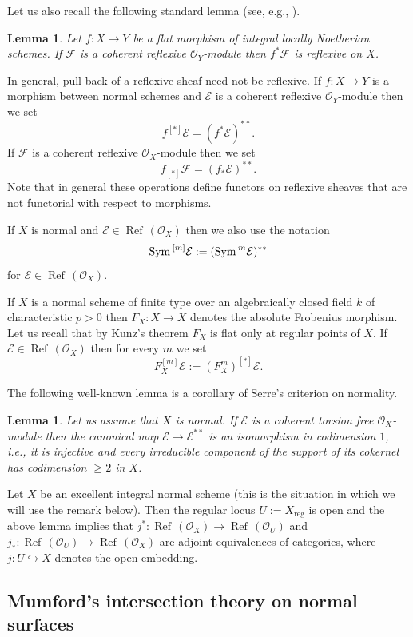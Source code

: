 \documentclass[twoside, 11pt]{article}
\theoremstyle{plain}
\newtheorem{Lemma}[Thm]{\sc Lemma}
\theoremstyle{definition}
\theoremstyle{remark}
\newcommand{\cE}{{\mathcal E}}
\newcommand{\cF}{{\mathcal F}}
\newcommand{\cO}{{\mathcal O}}
\newcommand{\Refl}{{\mathop{\operatorname{Ref}\, }}}
\newcommand{\Sym}{{\mathop{{\rm Sym \, }}}}
\begin{document}
Let us also recall the following standard lemma (see, e.g., \cite[Tag 0EBF]{SP}).

\begin{Lemma}
Let $f: X\to Y$ be a flat morphism of integral locally Noetherian schemes. If $\cF$ is a coherent reflexive $\cO_Y$-module then $f^*\cF$ is reflexive on $X$.
\end{Lemma}

In general, pull back of a reflexive sheaf need not be reflexive.
If $f: X\to Y$ is a morphism between normal schemes and $\cE$
is a  coherent reflexive $\cO_Y$-module then we set
$$f^{[*]}\cE=(f^*\cE)^{**}.$$
If $\cF$ is a coherent reflexive $\cO_X$-module then we set
$$f_{[*]}\cF=(f_*\cE)^{**}.$$
Note that in general these operations define functors on reflexive sheaves that are not functorial with respect to morphisms.

\medskip
If $X$ is normal and $\cE\in \Refl (\cO_X)$ then we also use the notation
$$\Sym ^{[m]}\cE:= (\Sym ^m\cE)^{**}$$
for $\cE\in \Refl (\cO_X)$.

If $X$ is a normal scheme of finite type over an algebraically closed field $k$ of characteristic $p>0$ 
then $F_X:X\to X$ denotes the absolute Frobenius morphism.  Let us recall that by Kunz's theorem $F_X$ is flat only at regular points of $X$.
If $\cE\in \Refl (\cO_X)$
then for every $m $ we set $$F_X^{[m]} \cE:= (F_X^{m})^{[*]} \cE.$$


\medskip

The following well-known lemma is a corollary of Serre's criterion on normality.

\begin{Lemma}\label{reflexivization-iso-in-codim-1}
Let us assume that $X$ is normal. If $\cE$ is a coherent torsion free $\cO_X$-module then 
the canonical map $\cE\to \cE^{**}$ is an isomorphism in codimension $1$, i.e., it is injective and every irreducible component of the support of its cokernel has codimension $\ge 2$ in $X$.
\end{Lemma}


\medskip

 Let $X$ be an excellent integral normal scheme (this is the situation in which we will use the remark below). 
 Then the regular locus
 $U:=X_{\mathrm {reg}}$ is open  and the above lemma implies that $j^*: \Refl (\cO_X)\to \Refl(\cO_U)$ and 
 $j_*:  \Refl (\cO_U)\to  \Refl (\cO_X)$ are adjoint equivalences of categories, where $j: U\hookrightarrow X $ denotes the open embedding.
  
\subsection{Mumford's intersection theory on normal surfaces}\label{Mumford's-intersection}
\end{document}
